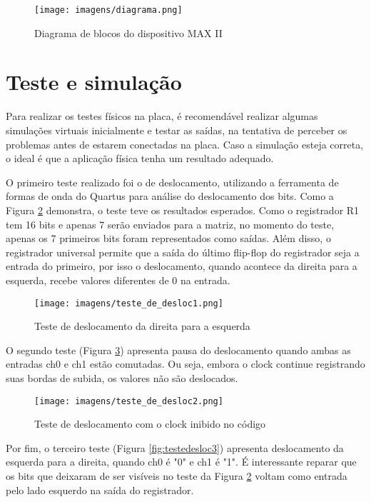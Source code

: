 \begin{figure}[!h]
  \centering
    \texttt{[image: imagens/diagrama.png]}
  \caption{Diagrama de blocos do dispositivo MAX II}
  \label{fig:diagramadeblocos}
\end{figure}

\section{Teste e simulação}

Para realizar os testes físicos na placa, é recomendável realizar algumas simulações virtuais inicialmente e testar as saídas, na tentativa de perceber os problemas antes de estarem conectadas na placa. Caso a simulação esteja correta, o ideal é que a aplicação física tenha um resultado adequado. 

O primeiro teste realizado foi o de deslocamento, utilizando a ferramenta de formas de onda do Quartus para análise do deslocamento dos bits. Como a Figura \ref{fig:testedesloc1} demonstra, o teste teve os resultados esperados. Como o registrador R1 tem 16 bits e apenas 7 serão enviados para a matriz, no momento do teste, apenas os 7 primeiros bits foram representados como saídas. Além disso, o registrador universal permite que a saída do último flip-flop do registrador seja a entrada do primeiro, por isso o deslocamento, quando acontece da direita para a esquerda, recebe valores diferentes de 0 na entrada. 

\begin{figure}[!h]
  \centering
    \texttt{[image: imagens/teste\_de\_desloc1.png]}
  \caption{Teste de deslocamento da direita para a esquerda}
  \label{fig:testedesloc1}
\end{figure}

O segundo teste (Figura \ref{fig:testedesloc2}) apresenta pausa do deslocamento quando ambas as entradas ch0 e ch1 estão comutadas. Ou seja, embora o clock continue registrando suas bordas de subida, os valores não são deslocados.

\begin{figure}[!h]
  \centering
    \texttt{[image: imagens/teste\_de\_desloc2.png]}
  \caption{Teste de deslocamento com o clock inibido no código}
  \label{fig:testedesloc2}
\end{figure}

Por fim, o terceiro teste (Figura \ref{fig:testedesloc3}) apresenta deslocamento da esquerda para a direita, quando ch0 é "0" e ch1 é "1". É interessante reparar que os bits que deixaram de ser visíveis no teste da Figura \ref{fig:testedesloc1} voltam como entrada pelo lado esquerdo na saída do registrador.

